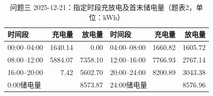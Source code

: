 \begin{table}[H]
\centering\footnotesize
\setlength{\tabcolsep}{4pt}
\caption{问题三 2025-12-21：指定时段充放电及首末储电量（题表2，单位：kWh）}
\label{tab:required-q3-2025-12-21-storage}
\begin{tabular}{@{}lrrlrr@{}}
\toprule
时间段 & 充电量 & 放电量 & 时间段 & 充电量 & 放电量 \\
\midrule
00:00--04:00 & 1640.14 & 0.00 & 04:00--08:00 & 1660.82 & 1605.72 \\
08:00--12:00 & 5884.07 & 7358.10 & 12:00--16:00 & 7766.93 & 2767.14 \\
16:00--20:00 & 7.42 & 5602.70 & 20:00--24:00 & 8200.89 & 3043.38 \\
\multicolumn{2}{l}{0:00储电量} & 8573.87 & \multicolumn{2}{l}{24:00储电量} & 8576.96 \\
\bottomrule
\end{tabular}
\end{table}

